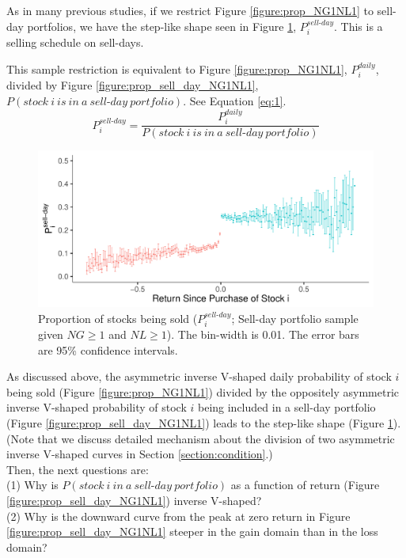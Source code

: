 \documentclass[11pt, a4paper]{article}
\begin{document}
As in many previous studies, if we restrict Figure \ref{figure:prop_NG1NL1} to sell-day portfolios, we have the step-like shape seen in Figure \ref{figure:prop_sell_days_NG1NL1}, $P^{sell\mbox{-}day}_{i}$. This is a selling schedule on sell-days.

This sample restriction is equivalent to Figure \ref{figure:prop_NG1NL1}, $P^{daily}_{i}$, divided by Figure \ref{figure:prop_sell_day_NG1NL1}, $P(stock~i~is~in~a~sell\mbox{-}day~portfolio)$. See Equation \ref{eq:1}.\\

\begin{equation}
	\label{eq:1}
P^{sell\mbox{-}day}_{i} = \frac{P^{daily}_{i}}{P(stock~i~is~in~a~sell\mbox{-}day~portfolio)}
\end{equation}


\begin{figure}[H]
	\centering
	\includegraphics[width=0.8\columnwidth]{barc_schedule_sell_day_NG1_NL1.pdf}
	\caption{\small Proportion of stocks being sold ($P^{sell\mbox{-}day}_{i}$; Sell-day portfolio sample given $NG\geq1$ and $NL\geq1$). The bin-width is 0.01. The error bars are 95\% confidence intervals.}
	\label{figure:prop_sell_days_NG1NL1}
\end{figure}

As discussed above, the asymmetric inverse V-shaped daily probability of stock $i$ being sold (Figure \ref{figure:prop_NG1NL1}) divided by the oppositely asymmetric inverse V-shaped probability of stock $i$ being included in a sell-day portfolio (Figure \ref{figure:prop_sell_day_NG1NL1}) leads to the step-like shape (Figure \ref{figure:prop_sell_days_NG1NL1}). (Note that we discuss detailed mechanism about the division of two asymmetric inverse V-shaped curves in Section \ref{section:condition}.) \\

Then, the next questions are:\\
(1) Why is $P(stock~i~in~a~sell\mbox{-}day~portfolio)$ as a function of return (Figure \ref{figure:prop_sell_day_NG1NL1}) inverse V-shaped?\\
(2) Why is the downward curve from the peak at zero return in Figure \ref{figure:prop_sell_day_NG1NL1} steeper in the gain domain than in the loss domain?\\
\end{document}
